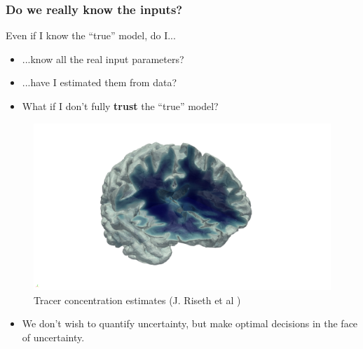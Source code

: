\documentclass[aspectratio=169,xcolor=dvipsnames,10pt]{beamer}
\begin{document}
\begin{frame}\frametitle{Do we \alert{really} know the inputs?}
\begin{exampleblock}{}
\begin{minipage}{0.5\textwidth}
    Even if I know the ``true'' model, do I...
\begin{itemize}
\item ...know all the real input parameters?
\item ...have I estimated them from data? 
\end{itemize}
\begin{itemize}
\item What if I don't fully \textbf{trust} the ``true'' model? 
\end{itemize}
\end{minipage}
\begin{minipage}{0.4\textwidth}
    \begin{figure}
        \centering
        \includegraphics[width=\textwidth,keepaspectratio]{Part I/figures/brain-mesh.png}
         \caption{Tracer concentration estimates (J. Riseth et al \cite{})}
        \label{fig:enter-label}
    \end{figure}
\end{minipage}
\begin{itemize}
\item We don't wish to \alert{quantify uncertainty}, but \alert{make optimal decisions} in the face of uncertainty.
\end{itemize}
\end{exampleblock}

\end{frame}
\end{document}
